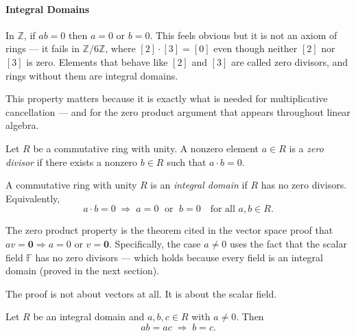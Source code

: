 \paragraph{Integral Domains}

\begin{remark}[Motivation]
In $\mathbb{Z}$, if $ab = 0$ then $a = 0$ or $b = 0$.
This feels obvious but it is not an axiom of rings --- it fails in
$\mathbb{Z}/6\mathbb{Z}$, where $[2] \cdot [3] = [0]$ even though
neither $[2]$ nor $[3]$ is zero. Elements that behave like $[2]$
and $[3]$ are called zero divisors, and rings without them are
integral domains.

This property matters because it is exactly what is needed for
multiplicative cancellation --- and for the zero product argument
that appears throughout linear algebra.
\end{remark}

\begin{definition}
Let $R$ be a commutative ring with unity.
A nonzero element $a \in R$ is a \emph{zero divisor} if there exists
a nonzero $b \in R$ such that $a \cdot b = 0$.
\end{definition}

\begin{definition}
A commutative ring with unity $R$ is an \emph{integral domain} if
$R$ has no zero divisors. Equivalently,
\[
a \cdot b = 0 \;\Longrightarrow\; a = 0 \;\text{ or }\; b = 0
\quad \text{for all } a, b \in R.
\]
\end{definition}

\begin{remark}
The zero product property is the theorem cited in the vector space proof
that $av = \mathbf{0} \Rightarrow a = 0$ or $v = \mathbf{0}$.
Specifically, the case $a \neq 0$ uses the fact that the scalar field
$\mathbb{F}$ has no zero divisors --- which holds because every field
is an integral domain (proved in the next section).

The proof is not about vectors at all. It is about the scalar field.
\end{remark}

\begin{proposition}
\label{prop:domain-cancellation}
Let $R$ be an integral domain and $a, b, c \in R$ with $a \neq 0$.
Then
\[
ab = ac \;\Longrightarrow\; b = c.
\]
\end{proposition}

